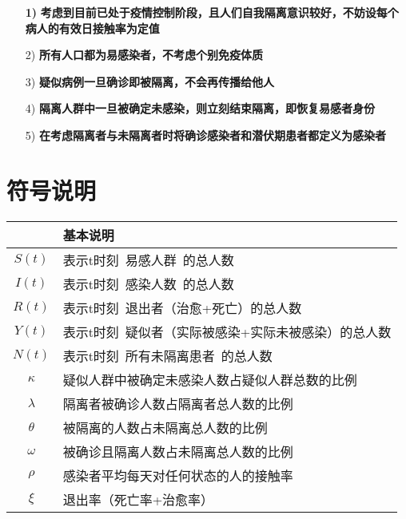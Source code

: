 \documentclass[UTF8]{ctexart}
\begin{document}
		\begin{itemize}
  \item [\bf{1)}]\bf{考虑到目前已处于疫情控制阶段，且人们自我隔离意识较好，不妨设每个病人的有效日接触率为定值}
  \item [2)]\bf{所有人口都为易感染者，不考虑个别免疫体质}
  \item [3)]\bf{疑似病例一旦确诊即被隔离，不会再传播给他人}
  \item [4)]\bf{隔离人群中一旦被确定未感染，则立刻结束隔离，即恢复易感者身份}
  \item [5)]\bf{在考虑隔离者与未隔离者时将确诊感染者和潜伏期患者都定义为感染者}
  
		\end{itemize}	

	\section{符号说明}

		
		\begin{table}[!htbp] 
		\begin{center}  
		\begin{tabular}{c|l}    
		\toprule[2pt]    
		\rowcolor[gray]{0.8}
		
		\multicolumn{1}{m{8em}}{\centering 符号}	&\multicolumn{1}{m{30em}}{\centering 基本说明}\\
		
		
		\midrule[1.3pt]
		$S(t)$ & 表示t时刻\ 易感人群\ 的总人数 \\   
		$I(t)$ & 表示t时刻\ 感染人数\ 的总人数\\    
		$R(t)$ & 表示t时刻\ 退出者（治愈+死亡）的总人数 \\ 
		$Y(t)$ & 表示t时刻\ 疑似者（实际被感染+实际未被感染）的总人数\\    
		$N(t)$ & 表示t时刻\ 所有未隔离患者\ 的总人数\\ 
		$\kappa$ & 疑似人群中被确定未感染人数占疑似人群总数的比例\\
		$\lambda$ &隔离者被确诊人数占隔离者总人数的比例\\
		$\theta$ & 被隔离的人数占未隔离总人数的比例\\
		$\omega$ & 被确诊且隔离人数占未隔离总人数的比例\\	
		$\rho$ &  感染者平均每天对任何状态的人的接触率\\
		$\xi$ &  退出率（死亡率+治愈率）\\	
		\bottomrule[2pt]   
		\end{tabular}  
		\end{center}
		\end{table}
		
\end{document}
